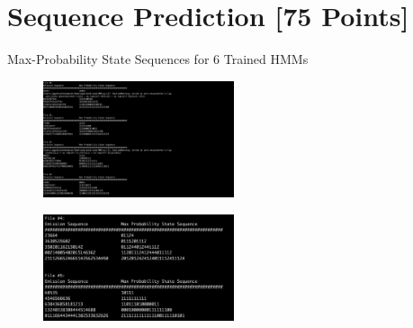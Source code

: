\newpage
\section{Sequence Prediction [75 Points]}

\indent\problem[10] %
Max-Probability State Sequences for 6 Trained HMMs
\begin{subsolution}
  \begin{figure}[H]
  	\centering
  	\includegraphics[width=0.5\textwidth]{img/set6template-7edca5b3.png}
  	\caption{}
  	\label{}
  \end{figure}

  \begin{figure}[H]
  	\centering
  	\includegraphics[width=0.5\textwidth]{img/set6template-f9aa7a5d.png}
  	\caption{}
  	\label{}
  \end{figure}
\end{subsolution}
\clearpage

